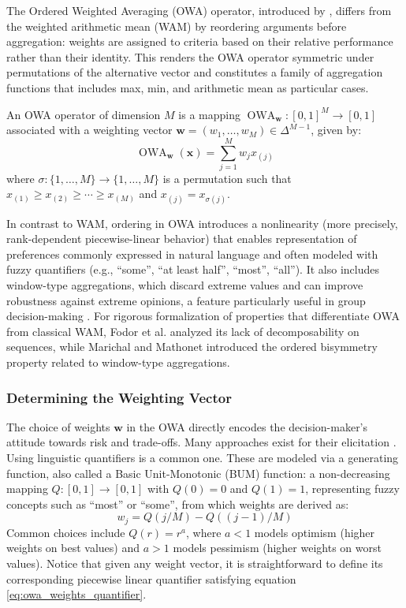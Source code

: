 The Ordered Weighted Averaging (OWA) operator, introduced by \citep{Yager1988OWA}, differs from the weighted arithmetic mean (WAM) by reordering arguments before aggregation: weights are assigned to criteria based on their relative performance rather than their identity. This renders the OWA operator symmetric under permutations of the alternative vector and constitutes a family of aggregation functions that includes max, min, and arithmetic mean as particular cases.

\begin{definition}
		An OWA operator of dimension $M$ is a mapping $\operatorname{OWA}_{\mathbf{w}}: [0,1]^M \to [0,1]$ associated with a weighting vector $\mathbf{w}=(w_1,\dots,w_M)\in\Delta^{M-1}$, given by:
		\[
			\operatorname{OWA}_{\mathbf{w}}(\mathbf{x})=\sum_{j=1}^M w_j x_{(j)}
		\]
		where $\sigma:\{1,\dots,M\}\to\{1,\dots,M\}$ is a permutation such that $x_{(1)}\ge x_{(2)}\ge\cdots\ge x_{(M)}$ and $x_{(j)}=x_{\sigma(j)}$.
\end{definition}

In contrast to WAM, ordering in OWA introduces a nonlinearity (more precisely, rank-dependent piecewise-linear behavior) that enables representation of preferences commonly expressed in natural language and often modeled with fuzzy quantifiers (e.g., ``some'', ``at least half'', ``most'', ``all''). It also includes window-type aggregations, which discard extreme values and can improve robustness against extreme opinions, a feature particularly useful in group decision-making \cite{OlympicOWA}. For rigorous formalization of properties that differentiate OWA from classical WAM, Fodor et al. \cite{FodorSeqOWAWAMProperties} analyzed its lack of decomposability on sequences, while Marichal and Mathonet \cite{Bisymmetry} introduced the ordered bisymmetry property related to window-type aggregations.

\subsubsection{Determining the Weighting Vector}
The choice of weights $\mathbf{w}$ in the OWA directly encodes the decision-maker's attitude towards risk and trade-offs. Many approaches exist for their elicitation \cite{OWAFamilies}. Using linguistic quantifiers \cite{LinguisticQuantifierYager} is a common one. These are modeled via a generating function, also called a Basic Unit-Monotonic (BUM) function: a non-decreasing mapping $Q: [0,1] \to [0,1]$ with $Q(0)=0$ and $Q(1)=1$, representing fuzzy concepts such as ``most'' or ``some'', from which weights are derived as:
\begin{equation}
\label{eq:owa_weights_quantifier}
w_j = Q(j/M) - Q((j-1)/M)
\end{equation}
Common choices include $Q(r) = r^a$, where $a < 1$ models optimism (higher weights on best values) and $a > 1$ models pessimism (higher weights on worst values). Notice that given any weight vector, it is straightforward to define its corresponding piecewise linear quantifier satisfying equation \ref{eq:owa_weights_quantifier}.

